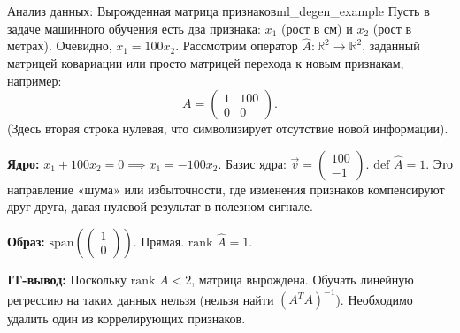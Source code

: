 \documentclass[12pt,a4paper]{article}
\begin{document}
\begin{definition}{Анализ данных: Вырожденная матрица
  признаков}{ml_degen_example}
  Пусть в задаче машинного обучения есть два признака: $x_1$ (рост в
  см) и $x_2$ (рост в метрах).
  Очевидно, $x_1 = 100 x_2$.
  Рассмотрим оператор $\hat{A}: \mathbb{R}^2 \to \mathbb{R}^2$,
  заданный матрицей ковариации или просто матрицей перехода к новым
  признакам, например:
  \[
    A =
    \begin{pmatrix} 1 & 100 \\ 0 & 0
    \end{pmatrix}.
  \]
  (Здесь вторая строка нулевая, что символизирует отсутствие новой информации).

  \textbf{Ядро:} $x_1 + 100x_2 = 0 \implies x_1 = -100x_2$.
  Базис ядра: $\vec{v} =
  \begin{pmatrix} 100 \\ -1
  \end{pmatrix}$.
  $\text{def } \hat{A} = 1$. Это направление «шума» или избыточности,
  где изменения признаков компенсируют друг друга, давая нулевой
  результат в полезном сигнале.

  \textbf{Образ:} $\text{span}\left(
    \begin{pmatrix} 1 \\ 0
  \end{pmatrix}\right)$. Прямая.
  $\text{rank } \hat{A} = 1$.

  \textbf{IT-вывод:} Поскольку $\text{rank } A < 2$, матрица
  вырождена. Обучать линейную регрессию на таких данных нельзя
  (нельзя найти $(A^TA)^{-1}$). Необходимо удалить один из
  коррелирующих признаков.
\end{definition}
\end{document}
